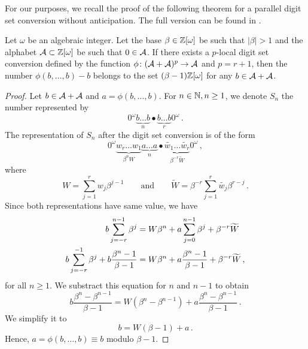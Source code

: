 For our purposes, we recall the proof of the following theorem for a parallel digit set conversion without anticipation. The full version can be found in \cite{minAlph}.
\begin{thm}
\label{thm:reprBetaMinusOne}
Let $\omega$ be an algebraic integer. Let the base $\beta\in\mathbb{Z}[\omega]$ be such that $|\beta|>1$ and the alphabet $\mathcal{A}\subset\mathbb{Z}[\omega]$ be such that $0\in\mathcal{A}$. If there exists a $p$-local digit set conversion defined by the function $\phi\colon (\mathcal{A}+\mathcal{A})^p\rightarrow \mathcal{A}$ and $p=r+1$, then the number $\phi(b,\dots,b)-b$ belongs to the set $(\beta-1)\mathbb{Z}[\omega]$ for any $b\in\mathcal{A}+\mathcal{A}$. 
\end{thm}
\begin{proof}
Let $b\in\mathcal{A}+\mathcal{A}$ and $a=\phi(b, \dots,b)$. For $n\in\mathbb{N}, n\geq 1$, we denote $S_n$ the number represented by
$$
0^\omega \underbrace{b\dots b}_{n}\bullet \underbrace{b\dots b}_{r}0^\omega\,.
$$
The representation of $S_n$ after the digit set conversion is of the form
$$
0^\omega \underbrace{w_{r}\dots w_{1}}_{\beta^n W}\underbrace{a\dots a}_{n}\bullet \underbrace{\widetilde{w_1}\dots \widetilde{w_r}}_{\beta^{-r}\widetilde{W}}0^\omega\,,
$$
where 
$$W=\sum_{j=1}^r w_j \beta^{j-1} \qquad \text{and} \qquad \widetilde{W}=\beta^{-r}\sum_{j=1}^r\widetilde{w_j} \beta^{r-j}\,.$$
Since both representations have same value, we have
\begin{align}
\label{eq:reprBetaMinusOne}
b \sum_{j=-r}^{n-1} \beta^j &= W \beta^n + a \sum_{j=0}^{n-1} \beta^j + \beta^{-r}\widetilde{W} \notag \\
b \sum_{j=-r}^{-1} \beta^j +b\frac{\beta^n-1}{\beta-1} &= W \beta^n + a \frac{\beta^n-1}{\beta-1} + \beta^{-r}\widetilde{W}\,,
\end{align}
for all $n\geq 1$. We substract this equation for $n$ and $n-1$ to obtain
$$
b\frac{\beta^n-\beta^{n-1}}{\beta-1}=W(\beta^n-\beta^{n-1}) + a\frac{\beta^n-\beta^{n-1}}{\beta-1}\,.
$$
We simplify it to
\begin{equation}
\label{eq:reprBetaMinusOneFinal}
b=W(\beta-1) + a\,.
\end{equation}
Hence, $a=\phi(b, \dots,b)\equiv b$ modulo $\beta-1$.
\end{proof}

